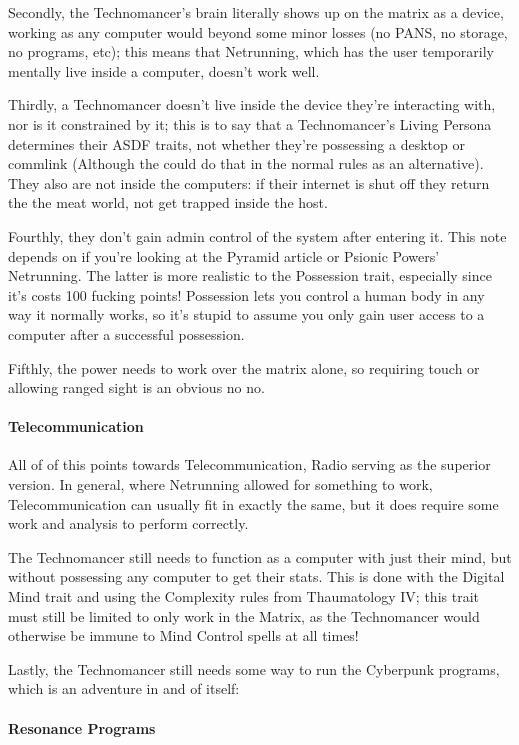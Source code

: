 \begin{multicols*}{2}
	Secondly, the Technomancer's brain literally shows up on the matrix as a device, working as any computer would beyond some minor losses (no PANS, no storage, no programs, etc); this means that Netrunning, which has the user temporarily mentally live inside a computer, doesn't work well. 
	
	Thirdly, a Technomancer doesn't live inside the device they're interacting with, nor is it constrained by it; this is to say that a Technomancer's Living Persona determines their ASDF traits, not whether they're possessing a desktop or commlink (Although the could do that in the normal rules as an alternative). They also are not inside the computers: if their internet is shut off they return the the meat world, not get trapped inside the host.
	
	Fourthly, they don't gain admin control of the system after entering it. This note depends on if you're looking at the Pyramid article or Psionic Powers' Netrunning. The latter is more realistic to the Possession trait, especially since it's costs 100 fucking points! Possession lets you control a human body in any way it normally works, so it's stupid to assume you only gain user access to a computer after a successful possession.
	
	Fifthly, the power needs to work over the matrix alone, so requiring touch or allowing ranged sight is an obvious no no.
	
	\paragraph{Telecommunication}
	
	All of of this points towards Telecommunication, Radio serving as the superior version. In general, where Netrunning allowed for something to work, Telecommunication can usually fit in exactly the same, but it does require some work and analysis to perform correctly. 
	
	The Technomancer still needs to function as a computer with just their mind, but without possessing any computer to get their stats. This is done with the Digital Mind trait and using the Complexity rules from Thaumatology IV; this trait must still be limited to only work in the Matrix, as the Technomancer would otherwise be immune to Mind Control spells at all times!
	
	Lastly, the Technomancer still needs some way to run the Cyberpunk programs, which is an adventure in and of itself:
	
	\paragraph{Resonance Programs}
	

\end{multicols*}
